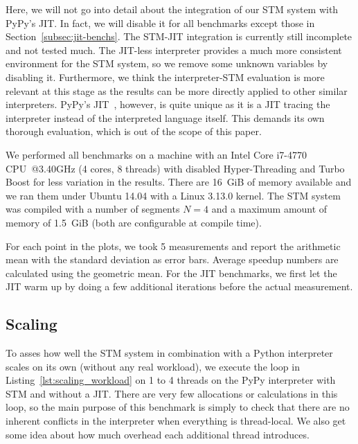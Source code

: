 \documentclass{sigplanconf}
\begin{document}
Here, we will not go into detail about the integration of our STM
system with PyPy's JIT. In fact, we will disable it for all benchmarks
except those in Section~\ref{subsec:jit-benchs}. The STM-JIT
integration is currently still incomplete and not tested much. The
JIT-less interpreter provides a much more consistent environment for
the STM system, so we remove some unknown variables by disabling it.
Furthermore, we think the interpreter-STM evaluation is more relevant
at this stage as the results can be more directly applied to other
similar interpreters. PyPy's JIT~\cite{cfbolz09}, however, is quite
unique as it is a JIT tracing the interpreter instead of the
interpreted language itself. This demands its own thorough
evaluation, which is out of the scope of this paper.


We performed all benchmarks on a machine with an Intel Core i7-4770
CPU~@3.40GHz (4 cores, 8 threads) with disabled Hyper-Threading and
Turbo Boost for less variation in the results.  There are 16~GiB of memory
available and we ran them under Ubuntu 14.04 with a Linux 3.13.0
kernel. The STM system was compiled with a number of segments $N=4$
and a maximum amount of memory of 1.5~GiB (both are configurable at
compile time).

For each point in the plots, we took 5 measurements and report the
arithmetic mean with the standard deviation as error bars. Average
speedup numbers are calculated using the geometric mean. For the JIT
benchmarks, we first let the JIT warm up by doing a few additional
iterations before the actual measurement.



\subsection{Scaling}

To asses how well the STM system in combination with a Python
interpreter scales on its own (without any real workload), we execute
the loop in Listing~\ref{lst:scaling_workload} on 1 to 4 threads on
the PyPy interpreter with STM and without a JIT.  There are very few
allocations or calculations in this loop, so the main purpose of this
benchmark is simply to check that there are no inherent conflicts in
the interpreter when everything is thread-local. We also get some
idea about how much overhead each additional thread introduces.
\end{document}
